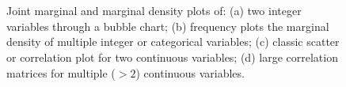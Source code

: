\documentclass{bioinfo}
\begin{document}
\begin{figure}
 \\
 \\
\caption{Joint marginal and marginal density plots of: (a) two integer variables through a bubble chart; (b) frequency plots the marginal density of multiple integer or categorical variables; (c) classic scatter or correlation plot for two continuous variables; (d) large correlation matrices for multiple ($> 2$) continuous variables.
}
\label{fig:4tabs}
\end{figure}
\end{document}
